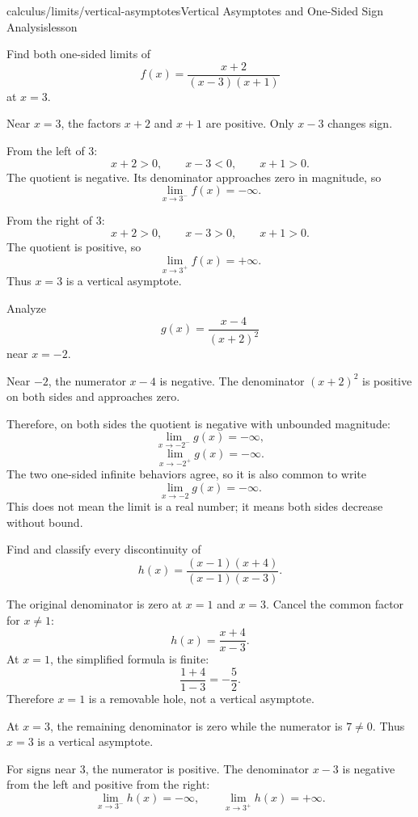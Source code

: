 \begin{webpage}{calculus/limits/vertical-asymptotes}{Vertical Asymptotes and One-Sided Sign Analysis}{lesson}
\begin{bgexample}[title={A sign chart with several factors}]
Find both one-sided limits of
\[
  f(x)=\frac{x+2}{(x-3)(x+1)}
\]
at \(x=3\).

\begin{bgsolution}
Near \(x=3\), the factors \(x+2\) and \(x+1\) are positive. Only \(x-3\) changes sign.

From the left of \(3\):
\[
  x+2>0,\qquad x-3<0,\qquad x+1>0.
\]
The quotient is negative. Its denominator approaches zero in magnitude, so
\[
  \boxed{\lim_{x\to3^-}f(x)=-\infty}.
\]

From the right of \(3\):
\[
  x+2>0,\qquad x-3>0,\qquad x+1>0.
\]
The quotient is positive, so
\[
  \boxed{\lim_{x\to3^+}f(x)=+\infty}.
\]
Thus \(x=3\) is a vertical asymptote.
\end{bgsolution}
\end{bgexample}

\begin{bgexample}[title={Even multiplicity}]
Analyze
\[
  g(x)=\frac{x-4}{(x+2)^2}
\]
near \(x=-2\).

\begin{bgsolution}
Near \(-2\), the numerator \(x-4\) is negative. The denominator \((x+2)^2\) is positive on both sides and approaches zero.

Therefore, on both sides the quotient is negative with unbounded magnitude:
\[
  \boxed{\lim_{x\to-2^-}g(x)=-\infty},
\]
\[
  \boxed{\lim_{x\to-2^+}g(x)=-\infty}.
\]
The two one-sided infinite behaviors agree, so it is also common to write
\[
  \lim_{x\to-2}g(x)=-\infty.
\]
This does not mean the limit is a real number; it means both sides decrease without bound.
\end{bgsolution}
\end{bgexample}

\begin{bgexample}[title={Exam-level: hole versus asymptote}]
Find and classify every discontinuity of
\[
  h(x)=\frac{(x-1)(x+4)}{(x-1)(x-3)}.
\]

\begin{bgsolution}
The original denominator is zero at \(x=1\) and \(x=3\). Cancel the common factor for \(x\ne1\):
\[
  h(x)=\frac{x+4}{x-3}.
\]
At \(x=1\), the simplified formula is finite:
\[
  \frac{1+4}{1-3}=-\frac52.
\]
Therefore \(x=1\) is a removable hole, not a vertical asymptote.

At \(x=3\), the remaining denominator is zero while the numerator is \(7\ne0\). Thus \(x=3\) is a vertical asymptote.

For signs near \(3\), the numerator is positive. The denominator \(x-3\) is negative from the left and positive from the right:
\[
  \lim_{x\to3^-}h(x)=-\infty,
  \qquad
  \lim_{x\to3^+}h(x)=+\infty.
\]
\end{bgsolution}
\end{bgexample}
\end{webpage}


